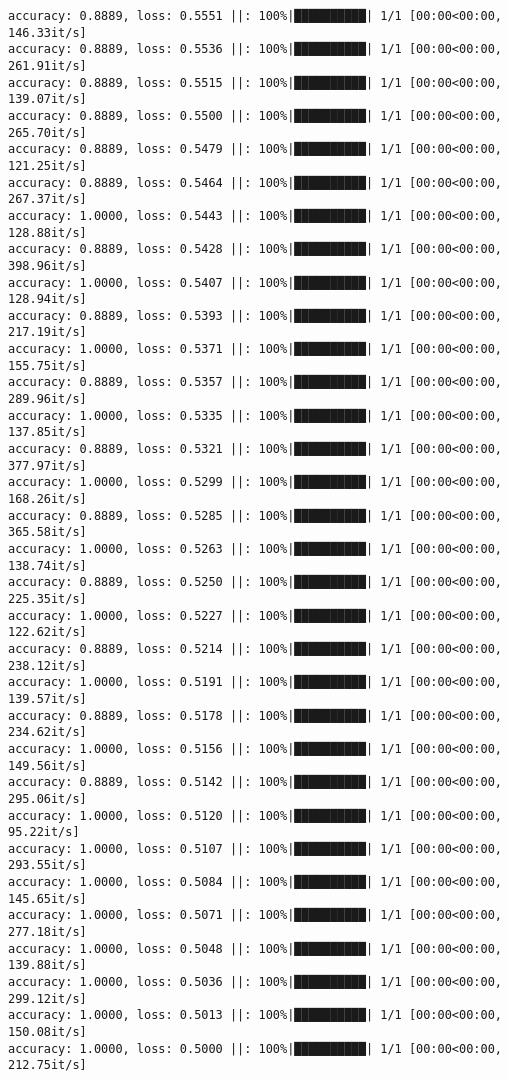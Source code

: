 \documentclass[
]{article}
\begin{document}
\begin{verbatim}
accuracy: 0.8889, loss: 0.5551 ||: 100%|██████████| 1/1 [00:00<00:00, 146.33it/s]
accuracy: 0.8889, loss: 0.5536 ||: 100%|██████████| 1/1 [00:00<00:00, 261.91it/s]
accuracy: 0.8889, loss: 0.5515 ||: 100%|██████████| 1/1 [00:00<00:00, 139.07it/s]
accuracy: 0.8889, loss: 0.5500 ||: 100%|██████████| 1/1 [00:00<00:00, 265.70it/s]
accuracy: 0.8889, loss: 0.5479 ||: 100%|██████████| 1/1 [00:00<00:00, 121.25it/s]
accuracy: 0.8889, loss: 0.5464 ||: 100%|██████████| 1/1 [00:00<00:00, 267.37it/s]
accuracy: 1.0000, loss: 0.5443 ||: 100%|██████████| 1/1 [00:00<00:00, 128.88it/s]
accuracy: 0.8889, loss: 0.5428 ||: 100%|██████████| 1/1 [00:00<00:00, 398.96it/s]
accuracy: 1.0000, loss: 0.5407 ||: 100%|██████████| 1/1 [00:00<00:00, 128.94it/s]
accuracy: 0.8889, loss: 0.5393 ||: 100%|██████████| 1/1 [00:00<00:00, 217.19it/s]
accuracy: 1.0000, loss: 0.5371 ||: 100%|██████████| 1/1 [00:00<00:00, 155.75it/s]
accuracy: 0.8889, loss: 0.5357 ||: 100%|██████████| 1/1 [00:00<00:00, 289.96it/s]
accuracy: 1.0000, loss: 0.5335 ||: 100%|██████████| 1/1 [00:00<00:00, 137.85it/s]
accuracy: 0.8889, loss: 0.5321 ||: 100%|██████████| 1/1 [00:00<00:00, 377.97it/s]
accuracy: 1.0000, loss: 0.5299 ||: 100%|██████████| 1/1 [00:00<00:00, 168.26it/s]
accuracy: 0.8889, loss: 0.5285 ||: 100%|██████████| 1/1 [00:00<00:00, 365.58it/s]
accuracy: 1.0000, loss: 0.5263 ||: 100%|██████████| 1/1 [00:00<00:00, 138.74it/s]
accuracy: 0.8889, loss: 0.5250 ||: 100%|██████████| 1/1 [00:00<00:00, 225.35it/s]
accuracy: 1.0000, loss: 0.5227 ||: 100%|██████████| 1/1 [00:00<00:00, 122.62it/s]
accuracy: 0.8889, loss: 0.5214 ||: 100%|██████████| 1/1 [00:00<00:00, 238.12it/s]
accuracy: 1.0000, loss: 0.5191 ||: 100%|██████████| 1/1 [00:00<00:00, 139.57it/s]
accuracy: 0.8889, loss: 0.5178 ||: 100%|██████████| 1/1 [00:00<00:00, 234.62it/s]
accuracy: 1.0000, loss: 0.5156 ||: 100%|██████████| 1/1 [00:00<00:00, 149.56it/s]
accuracy: 0.8889, loss: 0.5142 ||: 100%|██████████| 1/1 [00:00<00:00, 295.06it/s]
accuracy: 1.0000, loss: 0.5120 ||: 100%|██████████| 1/1 [00:00<00:00, 95.22it/s]
accuracy: 1.0000, loss: 0.5107 ||: 100%|██████████| 1/1 [00:00<00:00, 293.55it/s]
accuracy: 1.0000, loss: 0.5084 ||: 100%|██████████| 1/1 [00:00<00:00, 145.65it/s]
accuracy: 1.0000, loss: 0.5071 ||: 100%|██████████| 1/1 [00:00<00:00, 277.18it/s]
accuracy: 1.0000, loss: 0.5048 ||: 100%|██████████| 1/1 [00:00<00:00, 139.88it/s]
accuracy: 1.0000, loss: 0.5036 ||: 100%|██████████| 1/1 [00:00<00:00, 299.12it/s]
accuracy: 1.0000, loss: 0.5013 ||: 100%|██████████| 1/1 [00:00<00:00, 150.08it/s]
accuracy: 1.0000, loss: 0.5000 ||: 100%|██████████| 1/1 [00:00<00:00, 212.75it/s]

\end{verbatim}
\end{document}
